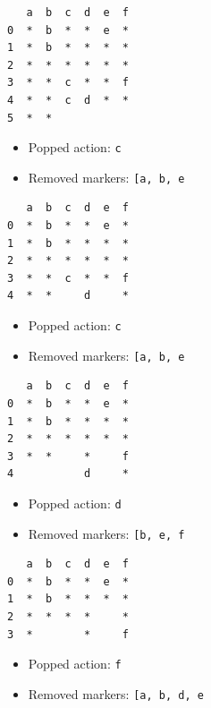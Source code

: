 \documentclass[11pt]{article}
\providecommand{\tightlist}{%
      \setlength{\itemsep}{0pt}\setlength{\parskip}{0pt}}
\begin{document}
\begin{verbatim}
   a  b  c  d  e  f
0  *  b  *  *  e  *
1  *  b  *  *  *  *
2  *  *  *  *  *  *
3  *  *  c  *  *  f
4  *  *  c  d  *  *
5  *  *            
\end{verbatim}

\begin{itemize}
\tightlist
\item
  Popped action: \texttt{c}
\item
  Removed markers:
  \texttt{{[}\textquotesingle{}a\textquotesingle{},\ \textquotesingle{}b\textquotesingle{},\ \textquotesingle{}e\textquotesingle{}{]}}
\end{itemize}

\begin{verbatim}
   a  b  c  d  e  f
0  *  b  *  *  e  *
1  *  b  *  *  *  *
2  *  *  *  *  *  *
3  *  *  c  *  *  f
4  *  *     d     *
\end{verbatim}

\begin{itemize}
\tightlist
\item
  Popped action: \texttt{c}
\item
  Removed markers:
  \texttt{{[}\textquotesingle{}a\textquotesingle{},\ \textquotesingle{}b\textquotesingle{},\ \textquotesingle{}e\textquotesingle{}{]}}
\end{itemize}

\begin{verbatim}
   a  b  c  d  e  f
0  *  b  *  *  e  *
1  *  b  *  *  *  *
2  *  *  *  *  *  *
3  *  *     *     f
4           d     *
\end{verbatim}

\begin{itemize}
\tightlist
\item
  Popped action: \texttt{d}
\item
  Removed markers:
  \texttt{{[}\textquotesingle{}b\textquotesingle{},\ \textquotesingle{}e\textquotesingle{},\ \textquotesingle{}f\textquotesingle{}{]}}
\end{itemize}

\begin{verbatim}
   a  b  c  d  e  f
0  *  b  *  *  e  *
1  *  b  *  *  *  *
2  *  *  *  *     *
3  *        *     f
\end{verbatim}

\begin{itemize}
\tightlist
\item
  Popped action: \texttt{f}
\item
  Removed markers:
  \texttt{{[}\textquotesingle{}a\textquotesingle{},\ \textquotesingle{}b\textquotesingle{},\ \textquotesingle{}d\textquotesingle{},\ \textquotesingle{}e\textquotesingle{}{]}}
\end{itemize}
\end{document}
